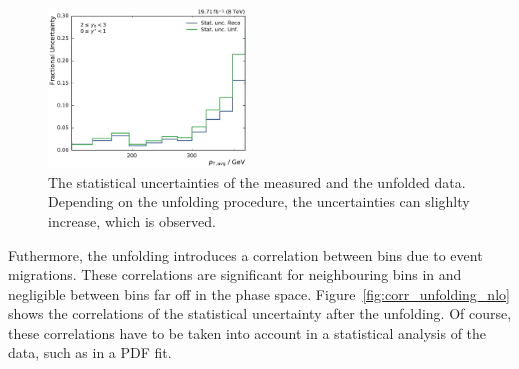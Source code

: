 \begin{figure}[htbp]
    \includegraphics[width=0.47\textwidth]{figures/measurement/statunc_fractional_yb2ys0.pdf}
    \caption[Statistical uncertainty of measured and unfolded sprectrum]{The
    statistical uncertainties of the measured and the unfolded data. Depending
    on the unfolding procedure, the uncertainties can slighlty increase, which
    is observed.}
    \label{fig:statunc_relative}
\end{figure}

Futhermore, the unfolding introduces a correlation between bins due to event
migrations. These correlations are significant for neighbouring bins in \pt and
negligible between bins far off in the phase space.
Figure~\ref{fig:corr_unfolding_nlo} shows the correlations of the statistical
uncertainty after the unfolding. Of course, these correlations have to be taken
into account in a statistical analysis of the data, such as in a PDF fit.

